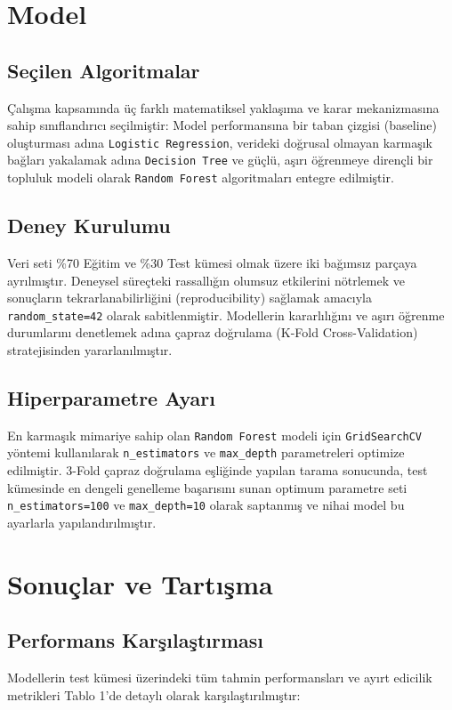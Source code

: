 \documentclass[11pt,a4paper]{article}
\begin{document}
\section{Model}
\subsection{Seçilen Algoritmalar}
Çalışma kapsamında üç farklı matematiksel yaklaşıma ve karar mekanizmasına sahip sınıflandırıcı seçilmiştir: Model performansına bir taban çizgisi (baseline) oluşturması adına \texttt{Logistic Regression}, verideki doğrusal olmayan karmaşık bağları yakalamak adına \texttt{Decision Tree} ve güçlü, aşırı öğrenmeye dirençli bir topluluk modeli olarak \texttt{Random Forest} algoritmaları entegre edilmiştir.
	\subsection{Deney Kurulumu}
Veri seti \%70 Eğitim ve \%30 Test kümesi olmak üzere iki bağımsız parçaya ayrılmıştır. Deneysel süreçteki rassallığın olumsuz etkilerini nötrlemek ve sonuçların tekrarlanabilirliğini (reproducibility) sağlamak amacıyla \texttt{random\_state=42} olarak sabitlenmiştir. Modellerin kararlılığını ve aşırı öğrenme durumlarını denetlemek adına çapraz doğrulama (K-Fold Cross-Validation) stratejisinden yararlanılmıştır.

\subsection{Hiperparametre Ayarı}
En karmaşık mimariye sahip olan \texttt{Random Forest} modeli için \texttt{GridSearchCV} yöntemi kullanılarak \texttt{n\_estimators} ve \texttt{max\_depth} parametreleri optimize edilmiştir. 3-Fold çapraz doğrulama eşliğinde yapılan tarama sonucunda, test kümesinde en dengeli genelleme başarısını sunan optimum parametre seti \texttt{n\_estimators=100} ve \texttt{max\_depth=10} olarak saptanmış ve nihai model bu ayarlarla yapılandırılmıştır.

\section{Sonuçlar ve Tartışma}
\subsection{Performans Karşılaştırması}
Modellerin test kümesi üzerindeki tüm tahmin performansları ve ayırt edicilik metrikleri Tablo 1'de detaylı olarak karşılaştırılmıştır:
\end{document}
